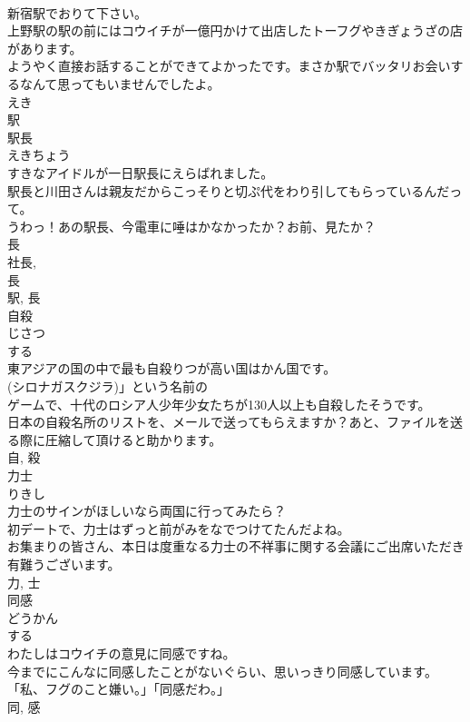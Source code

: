 \documentclass[8pt]{extreport}
\begin{document}
\begin{CJK}{UTF8}{min}
\\	新宿駅でおりて下さい。	
\\	上野駅の駅の前にはコウイチが一億円かけて出店したトーフグやきぎょうざの店があります。	
\\	ようやく直接お話することができてよかったです。まさか駅でバッタリお会いするなんて思ってもいませんでしたよ。	
\\	えき 
\\	駅	
\\	駅長	
\\	えきちょう	
\\	すきなアイドルが一日駅長にえらばれました。	
\\	駅長と川田さんは親友だからこっそりと切ぷ代をわり引してもらっているんだって。	
\\	うわっ！あの駅長、今電車に唾はかなかったか？お前、見たか？	
\\	長 
\\	社長, 
\\	長 
\\	駅, 長	
\\	自殺	
\\	じさつ	
\\	する 
\\	東アジアの国の中で最も自殺りつが高い国はかん国です。	
\\	(シロナガスクジラ)」という名前の
\\	ゲームで、十代のロシア人少年少女たちが130人以上も自殺したそうです。	
\\	日本の自殺名所のリストを、メールで送ってもらえますか？あと、ファイルを送る際に圧縮して頂けると助かります。	
\\	自, 殺	
\\	力士	
\\	りきし	
\\	力士のサインがほしいなら両国に行ってみたら？	
\\	初デートで、力士はずっと前がみをなでつけてたんだよね。	
\\	お集まりの皆さん、本日は度重なる力士の不祥事に関する会議にご出席いただき有難うございます。	
\\	力, 士	
\\	同感	
\\	どうかん	
\\	する 
\\	わたしはコウイチの意見に同感ですね。	
\\	今までにこんなに同感したことがないぐらい、思いっきり同感しています。	
\\	「私、フグのこと嫌い。」「同感だわ。」	
\\	同, 感	

\end{CJK}
\end{document}

